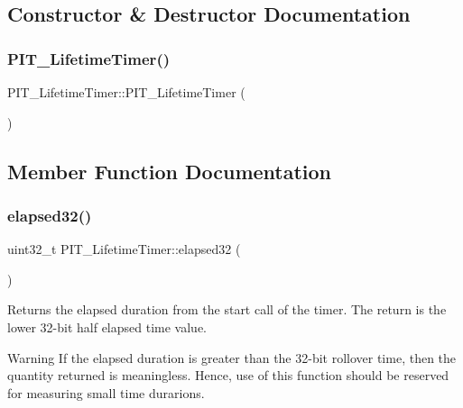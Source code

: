 \subsection{Constructor \& Destructor Documentation}
\mbox{\label{classPIT__LifetimeTimer_a826797e75688ab4e7cd5c8854fa6a7c0}} 
\subsubsection{\texorpdfstring{P\+I\+T\+\_\+\+Lifetime\+Timer()}{PIT\_LifetimeTimer()}}
{\footnotesize\ttfamily P\+I\+T\+\_\+\+Lifetime\+Timer\+::\+P\+I\+T\+\_\+\+Lifetime\+Timer (\begin{DoxyParamCaption}{ }\end{DoxyParamCaption})\hspace{0.3cm}{\ttfamily [inline]}}



\subsection{Member Function Documentation}
\mbox{\label{classPIT__LifetimeTimer_af7481214070333f845a23456b4d75880}} 
\subsubsection{\texorpdfstring{elapsed32()}{elapsed32()}}
{\footnotesize\ttfamily uint32\+\_\+t P\+I\+T\+\_\+\+Lifetime\+Timer\+::elapsed32 (\begin{DoxyParamCaption}{ }\end{DoxyParamCaption})\hspace{0.3cm}{\ttfamily [inline]}}



Returns the elapsed duration from the start call of the timer. The return is the lower 32-\/bit half elapsed time value. 

\begin{DoxyWarning}{Warning}
If the elapsed duration is greater than the 32-\/bit rollover time, then the quantity returned is meaningless. Hence, use of this function should be reserved for measuring small time durarions. 
\end{DoxyWarning}
\mbox{\label{classPIT__LifetimeTimer_a04adf2272a47d4c81a28c6363e2da4fd}} 
